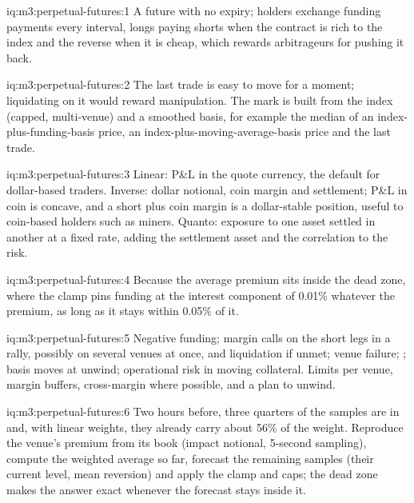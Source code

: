 \begin{solution}{iq:m3:perpetual-futures:1}
A future with no expiry; holders exchange funding payments every interval, longs paying shorts when the contract is
rich to the index and the reverse when it is cheap, which rewards arbitrageurs for pushing it back.
\end{solution}

\begin{solution}{iq:m3:perpetual-futures:2}
The last trade is easy to move for a moment; liquidating on it would reward manipulation. The mark is built from the
index (capped, multi-venue) and a smoothed basis, for example the median of an index-plus-funding-basis price, an
index-plus-moving-average-basis price and the last trade.
\end{solution}

\begin{solution}{iq:m3:perpetual-futures:3}
Linear: P\&L in the quote currency, the default for dollar-based traders. Inverse: dollar notional, coin margin and
settlement; P\&L in coin is concave, and a short plus coin margin is a dollar-stable position, useful to coin-based
holders such as miners. Quanto: exposure to one asset settled in another at a fixed rate, adding the settlement asset
and the correlation to the risk.
\end{solution}

\begin{solution}{iq:m3:perpetual-futures:4}
Because the average premium sits inside the dead zone, where the clamp pins funding at the interest component of
0.01\% whatever the premium, as long as it stays within 0.05\% of it.
\end{solution}

\begin{solution}{iq:m3:perpetual-futures:5}
Negative funding; margin calls on the short legs in a rally, possibly on several venues at once, and liquidation if
unmet; venue failure;  ; basis moves at unwind; operational risk in moving collateral. Limits per
venue, margin buffers, cross-margin where possible, and a plan to unwind.
\end{solution}

\begin{solution}{iq:m3:perpetual-futures:6}
Two hours before, three quarters of the samples are in and, with linear weights, they already carry about 56\% of the
weight. Reproduce the venue's premium from its book (impact notional, 5-second sampling), compute the weighted
average so far, forecast the remaining samples (their current level, mean reversion) and apply the clamp and caps;
the dead zone makes the answer exact whenever the forecast stays inside it.
\end{solution}

